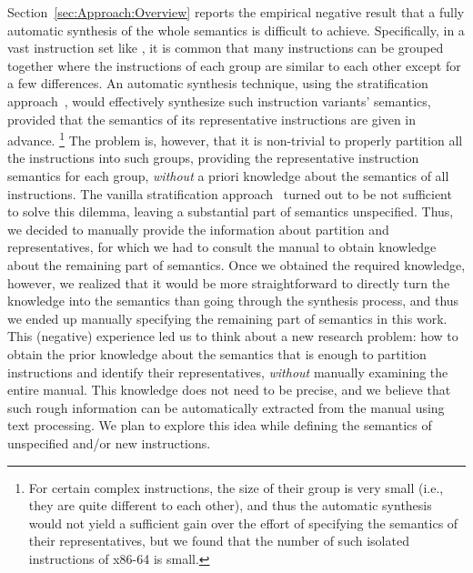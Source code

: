Section~\ref{sec:Approach:Overview} reports the empirical negative result that a fully automatic synthesis of the whole \ISA semantics is difficult to achieve.
Specifically, in a vast instruction set like \ISA {}, it is common that many instructions can be grouped together where the instructions of each group are similar to each other except for a few differences.
An automatic synthesis technique, using the stratification approach~\cite{Heule2016a}, would effectively synthesize such instruction variants' semantics, provided that the semantics of its representative instructions are given in advance.
\footnote{For certain complex instructions, the size of their group is very small (i.e., they are quite different to each other), and thus the automatic synthesis would not yield a sufficient gain over the effort of specifying the semantics of their representatives, but we found that the number of such isolated instructions of x86-64 is small.}
The problem is, however, that it is non-trivial to properly partition all the instructions into such groups, providing the representative instruction semantics for each group, \emph{without} a priori knowledge about the semantics of all instructions.
The vanilla stratification approach~\cite{Heule2016a} turned out to be not sufficient to solve this dilemma, leaving a substantial part of semantics unspecified.
Thus, we decided to manually provide the information about partition and representatives, for which we had to consult the manual to obtain knowledge about the remaining part of semantics.
Once we obtained the required knowledge, however, we realized that it would be more straightforward to directly turn the knowledge into the semantics than going through the synthesis process, and thus we ended up manually specifying the remaining part of semantics in this work.
%
This (negative) experience led us to think about a new research problem: how to obtain the prior knowledge about the semantics that is enough to partition instructions and identify their representatives, \emph{without} manually examining the entire manual.
This  knowledge does not need to be precise, and we believe that such rough information can be automatically extracted from the manual using text processing.  We plan to explore this idea while defining the semantics of unspecified and/or new instructions.

